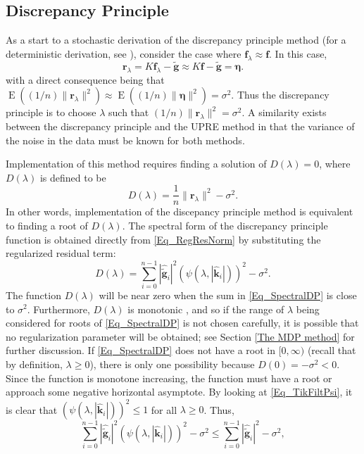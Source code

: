\documentclass[12pt]{article}
\newcommand{\gnoise}{\widetilde{\mathbf{g}}}
\newcommand{\kdis}{\mathbf{k}}
\newcommand{\kmat}{K}	%
\newcommand{\fdis}{\mathbf{f}}
\newcommand{\regparam}{\lambda}
\newcommand{\freg}{\fdis_{\regparam}}	%
\newcommand{\mfilt}{\psi}
\newcommand{\noiseSD}{\sigma}	%
\newcommand{\noise}{\bm{\eta}}	%
\newcommand{\E}{\operatorname{E}}	%
\newcommand{\regres}{\mathbf{r}_{\regparam}}	%
\newcommand{\D}{D}	%
\begin{document}
\subsection{Discrepancy Principle} \label{Discrepancy Principle}
As a start to a stochastic derivation of the discrepancy principle method (for a deterministic derivation, see \cite{Vogel:2002}), consider the case where $\freg \approx \fdis$. In this case,
\[\regres = \kmat\freg - \gnoise \approx \kmat\fdis - \gnoise = \noise.\]
with a direct consequence being that $\E((1/n)\|\regres\|^2) \approx \E((1/n)\|\noise\|^2) =\noiseSD^2$. Thus the discrepancy principle is to choose $\regparam$ such that $(1/n)\|\regres\|^2 = \noiseSD^2$. A similarity exists between the discrepancy principle and the UPRE method in that the variance of the noise in the data must be known for both methods. \par 
Implementation of this method requires finding a solution of $\D(\regparam) = 0$, where $\D(\regparam)$ is defined to be
\begin{equation}
\label{Eq_DP}
\D(\regparam) = \frac{1}{n}\|\regres\|^2 - \noiseSD^2.
\end{equation}
In other words, implementation of the discepancy principle method is equivalent to finding a root of $\D(\regparam)$. The spectral form of the discrepancy principle function is obtained directly from \eqref{Eq_RegResNorm} by substituting the regularized residual term:
\begin{equation}
\D(\regparam) = \sum_{i = 0}^{n-1} |\widehat{\gnoise}_i|^2(\mfilt(\regparam,|\widehat{\kdis}_i|))^2 - \noiseSD^2.
\label{Eq_SpectralDP}
\end{equation}
The function $\D(\regparam)$ will be near zero when the sum in \eqref{Eq_SpectralDP} is close to $\noiseSD^2$.  Furthermore, $\D(\regparam)$ is monotonic \cite{Vogel:2002}, and so if the range of $\regparam$ being considered for roots of \eqref{Eq_SpectralDP} is not chosen carefully, it is possible that no regularization parameter will be obtained; see Section \ref{The MDP method} for further discussion. If \eqref{Eq_SpectralDP} does not have a root in $[0,\infty)$ (recall that by definition, $\regparam \geq 0$), there is only one possibility because $\D(0) = -\noiseSD^2 < 0$. Since the function is monotone increasing, the function must have a root or approach some negative horizontal asymptote. By looking at \eqref{Eq_TikFiltPsi}, it is clear that $(\mfilt(\regparam,|\widehat{\kdis}_i|))^2 \leq 1$ for all $\lambda \geq 0$. Thus,
\[\sum_{i = 0}^{n-1} |\widehat{\gnoise}_i|^2(\mfilt(\regparam,|\widehat{\kdis}_i|))^2 - \noiseSD^2 \leq \sum_{i = 0}^{n-1} |\widehat{\gnoise}_i|^2 - \noiseSD^2,\]
\end{document}
